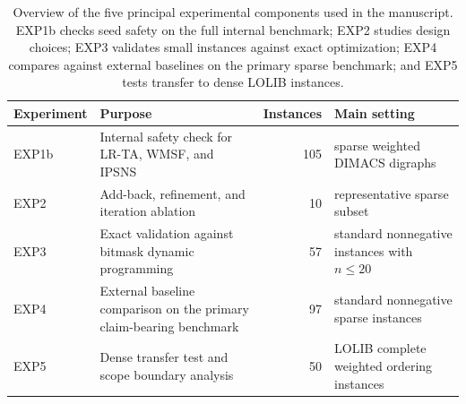 \begin{table}[t]
\centering
\small
\caption{Overview of the five principal experimental components used in the manuscript. EXP1b checks seed safety on the full internal benchmark; EXP2 studies design choices; EXP3 validates small instances against exact optimization; EXP4 compares against external baselines on the primary sparse benchmark; and EXP5 tests transfer to dense LOLIB instances.}
\label{tab:experiment-overview}
\begin{tabularx}{\linewidth}{@{}lXrX@{}}
\toprule
Experiment & Purpose & Instances & Main setting \\
\midrule
EXP1b & Internal safety check for LR-TA, WMSF, and IPSNS & 105 & sparse weighted DIMACS digraphs \\
EXP2 & Add-back, refinement, and iteration ablation & 10 & representative sparse subset \\
EXP3 & Exact validation against bitmask dynamic programming & 57 & standard nonnegative instances with $n \le 20$ \\
EXP4 & External baseline comparison on the primary claim-bearing benchmark & 97 & standard nonnegative sparse instances \\
EXP5 & Dense transfer test and scope boundary analysis & 50 & LOLIB complete weighted ordering instances \\
\bottomrule
\end{tabularx}
\end{table}
